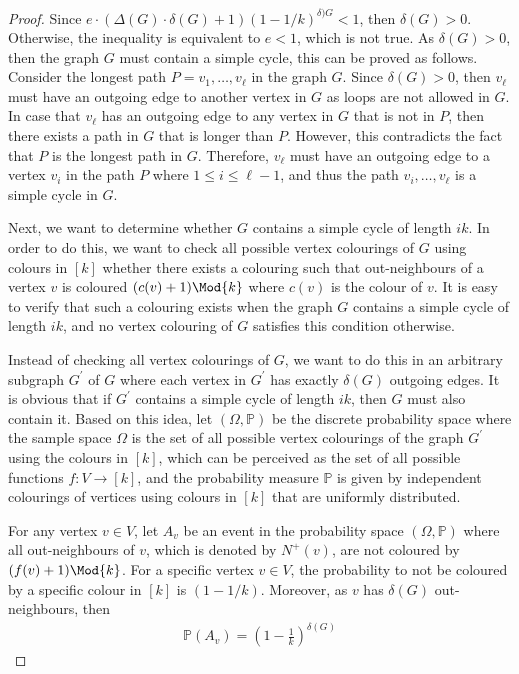 \begin{proof}
  Since $e \cdot (\Delta(G) \cdot \delta(G) + 1)(1-1/k)^{\delta)G} < 1$, then $\delta(G) > 0$. Otherwise, the inequality is equivalent to $e < 1$, which is not true. As $\delta(G) > 0$, then the graph $G$ must contain a simple cycle, this can be proved as follows. Consider the longest path $P = v_{1},\ldots, v_{\ell}$ in the graph $G$. Since $\delta(G) > 0$, then $v_{\ell}$ must have an outgoing edge to another vertex in $G$ as loops are not allowed in $G$. In case that $v_{\ell}$ has an outgoing edge to any vertex in $G$ that is not in $P$, then there exists a path in $G$ that is longer than $P$. However, this contradicts the fact that $P$ is the longest path in $G$. Therefore, $v_{\ell}$ must have an outgoing edge to a vertex $v_{i}$ in the path $P$ where $1 \leq i \leq \ell - 1$, and thus the path $v_{i}, \ldots, v_{\ell}$ is a simple cycle in $G$.

  Next, we want to determine whether $G$ contains a simple cycle of length $ik$. In order to do this, we want to check all possible vertex colourings of $G$ using colours in $[k]$ whether there exists a colouring such that out-neighbours of a vertex $v$ is coloured $(c(v)+1) \Mod{k}$ where $c(v)$ is the colour of $v$. It is easy to verify that such a colouring exists when the graph $G$ contains a simple cycle of length $ik$, and no vertex colouring of $G$ satisfies this condition otherwise.

  Instead of checking all vertex colourings of $G$, we want to do this in an arbitrary subgraph $G^{'}$ of $G$ where each vertex in $G^{'}$ has exactly $\delta(G)$ outgoing edges. It is obvious that if $G^{'}$ contains a simple cycle of length $ik$, then $G$ must also contain it. Based on this idea, let $(\Omega, \mathbb{P})$ be the discrete probability space where the sample space $\Omega$ is the set of all possible vertex colourings of the graph $G^{'}$ using the colours in $[k]$, which can be perceived as the set of all possible functions $f : V \to [k]$, and the probability measure $\mathbb{P}$ is given by independent colourings of vertices using colours in $[k]$ that are uniformly distributed.

  For any vertex $v \in V$, let $A_{v}$ be an event in the probability space $(\Omega, \mathbb{P})$ where all out-neighbours of $v$, which is denoted by $N^{+}(v)$, are not coloured by $(f(v)+1) \Mod{k}$. For a specific vertex $v \in V$, the probability to not be coloured by a specific colour in $[k]$ is $(1 - 1/k)$. Moreover, as $v$ has $\delta(G)$ out-neighbours, then 
  \begin{align*}
    \mathbb{P}(A_{v}) = (1-\frac{1}{k})^{\delta(G)}
  \end{align*}


\end{proof}
